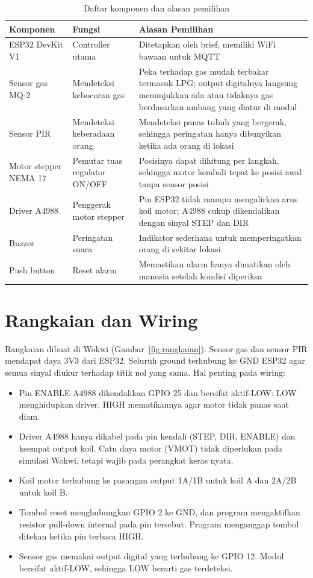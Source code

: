 \documentclass[12pt,a4paper,oneside]{report}
\begin{document}
\begin{table}[H]
  \caption{Daftar komponen dan alasan pemilihan}
  \label{tab:komponen}
  \begin{tabularx}{\textwidth}{P{3cm} P{3.2cm} L}
    \toprule
    \textbf{Komponen} & \textbf{Fungsi} & \textbf{Alasan Pemilihan} \\
    \midrule
    ESP32 DevKit V1 & Controller utama & Ditetapkan oleh brief; memiliki WiFi bawaan untuk MQTT \\
    Sensor gas MQ-2 & Mendeteksi kebocoran gas & Peka terhadap gas mudah terbakar termasuk LPG; output digitalnya langsung menunjukkan ada atau tidaknya gas berdasarkan ambang yang diatur di modul \\
    Sensor PIR & Mendeteksi keberadaan orang & Mendeteksi panas tubuh yang bergerak, sehingga peringatan hanya dibunyikan ketika ada orang di lokasi \\
    Motor stepper NEMA 17 & Pemutar tuas regulator ON/OFF & Posisinya dapat dihitung per langkah, sehingga motor kembali tepat ke posisi awal tanpa sensor posisi \\
    Driver A4988 & Penggerak motor stepper & Pin ESP32 tidak mampu mengalirkan arus koil motor; A4988 cukup dikendalikan dengan sinyal STEP dan DIR \\
    Buzzer & Peringatan suara & Indikator sederhana untuk memperingatkan orang di sekitar lokasi \\
    Push button & Reset alarm & Memastikan alarm hanya dimatikan oleh manusia setelah kondisi diperiksa \\
    \bottomrule
  \end{tabularx}
\end{table}

\section{Rangkaian dan Wiring}
Rangkaian dibuat di Wokwi (Gambar~\ref{fig:rangkaian}). Sensor gas dan sensor PIR mendapat daya 3V3 dari ESP32. Seluruh ground terhubung ke GND ESP32 agar semua sinyal diukur terhadap titik nol yang sama. Hal penting pada wiring:
\begin{itemize}
  \item Pin ENABLE A4988 dikendalikan GPIO 25 dan bersifat aktif-LOW: LOW menghidupkan driver, HIGH mematikannya agar motor tidak panas saat diam.
  \item Driver A4988 hanya dikabel pada pin kendali (STEP, DIR, ENABLE) dan keempat output koil. Catu daya motor (VMOT) tidak diperlukan pada simulasi Wokwi, tetapi wajib pada perangkat keras nyata.
  \item Koil motor terhubung ke pasangan output 1A/1B untuk koil A dan 2A/2B untuk koil B.
  \item Tombol reset menghubungkan GPIO 2 ke GND, dan program mengaktifkan resistor pull-down internal pada pin tersebut. Program menganggap tombol ditekan ketika pin terbaca HIGH.
  \item Sensor gas memakai output digital yang terhubung ke GPIO 12. Modul bersifat aktif-LOW, sehingga LOW berarti gas terdeteksi.
\end{itemize}
\end{document}
